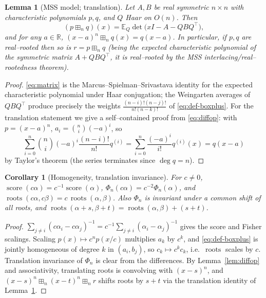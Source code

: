 \documentclass[12pt]{article}
\newtheorem{lemma}{Lemma}
\newtheorem{corollary}{Corollary}
\theoremstyle{definition}
\DeclareMathOperator{\roots}{roots}
\DeclareMathOperator{\score}{score}
\newcommand{\bR}{\mathbb{R}}
\newcommand{\bE}{\mathbb{E}}
\newcommand{\boxp}{\boxplus_n}
\begin{document}
\begin{lemma}[MSS model; translation]\label{lem:matrix}
Let $A,B$ be real symmetric $n\times n$ with characteristic polynomials $p,q$, and $Q$ Haar
on $O(n)$. Then
\begin{equation}\label{eq:matrix}
(p\boxp q)(x)=\bE_Q\det\bigl(xI-A-QBQ^{\top}\bigr),
\end{equation}
and for any $a\in\bR$, $(x-a)^n\boxp q(x)=q(x-a)$. In particular, if $p,q$ are
real--rooted then so is $r=p\boxp q$ \textup{(}being the expected characteristic polynomial of
the symmetric matrix $A+QBQ^\top$, it is real--rooted by the MSS interlacing/real--rootedness
theorem\textup{)}.
\end{lemma}

\begin{proof}
\eqref{eq:matrix} is the Marcus--Spielman--Srivastava identity for the expected
characteristic polynomial under Haar conjugation; the Weingarten averages of $QBQ^\top$
produce precisely the weights $\frac{(n-i)!(n-j)!}{n!(n-k)!}$ of \eqref{eq:def-boxplus}.
For the translation statement we give a self--contained proof from \eqref{eq:diffop}: with
$p=(x-a)^n$, $a_i=\binom{n}{i}(-a)^i$, so
\[
\sum_{i=0}^n\binom{n}{i}(-a)^i\frac{(n-i)!}{n!}q^{(i)}
=\sum_{i=0}^n\frac{(-a)^i}{i!}q^{(i)}(x)=q(x-a)
\]
by Taylor's theorem (the series terminates since $\deg q=n$).
\end{proof}

\begin{corollary}[Homogeneity, translation invariance]\label{cor:homog}
For $c\ne0$, $\score(c\alpha)=c^{-1}\score(\alpha)$, $\Phi_n(c\alpha)=c^{-2}\Phi_n(\alpha)$,
and $\roots(c\alpha,c\beta)=c\,\roots(\alpha,\beta)$. Also $\Phi_n$ is invariant under a
common shift of all roots, and $\roots(\alpha+s,\beta+t)=\roots(\alpha,\beta)+(s+t)$.
\end{corollary}

\begin{proof}
$\sum_{j\ne i}(c\alpha_i-c\alpha_j)^{-1}=c^{-1}\sum_{j\ne i}(\alpha_i-\alpha_j)^{-1}$ gives
the score and Fisher scalings. Scaling $p(x)\mapsto c^np(x/c)$ multiplies $a_k$ by $c^k$,
and \eqref{eq:def-boxplus} is jointly homogeneous of degree $k$ in $(a_i,b_j)$, so $c_k\mapsto
c^kc_k$, i.e.\ $\roots$ scales by $c$. Translation invariance of $\Phi_n$ is clear from the
differences. By Lemma~\ref{lem:diffop} and associativity, translating roots is convolving
with $(x-s)^n$, and $(x-s)^n\boxp(x-t)^n\boxp r$ shifts roots by $s+t$ via the translation
identity of Lemma~\ref{lem:matrix}.
\end{proof}
\end{document}
